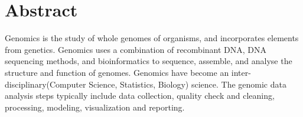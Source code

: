 \chapter*{Abstract}
Genomics is the study of whole genomes of organisms, and incorporates elements from genetics. Genomics uses a combination of recombinant DNA, DNA sequencing methods, and bioinformatics to sequence, assemble, and analyse the structure and function of genomes. Genomics have become an inter-disciplinary(Computer Science, Statistics, Biology) science. The genomic data analysis steps typically include data collection, quality check and cleaning, processing, modeling, visualization and reporting.






